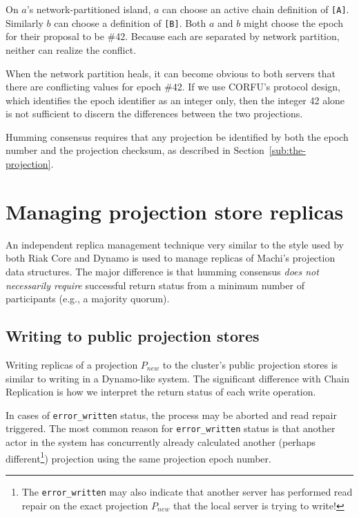 \documentclass[preprint,10pt]{sigplanconf}
\begin{document}
On $a$'s network-partitioned island, $a$ can choose
an active chain definition of {\tt [A]}.
Similarly $b$ can choose a definition of {\tt [B]}.  Both $a$ and $b$
might choose the
epoch for their proposal to be \#42.  Because each are separated by
network partition, neither can realize the conflict.

When the network partition heals, it can become obvious to both
servers that there are conflicting values for epoch \#42.  If we
use CORFU's protocol design, which identifies the epoch identifier as
an integer only, then the integer 42 alone is not sufficient to
discern the differences between the two projections.

Humming consensus requires that any projection be identified by both
the epoch number and the projection checksum, as described in
Section~\ref{sub:the-projection}.

\section{Managing projection store replicas}
\label{sec:managing-multiple-projection-stores}

An independent replica management technique very similar to the style
used by both Riak Core \cite{riak-core} and Dynamo is used to manage
replicas of Machi's projection data structures.
The major difference is that humming consensus
{\em does not necessarily require}
successful return status from a minimum number of participants (e.g.,
a majority quorum).

\subsection{Writing to public projection stores}
\label{sub:proj-store-writing}

Writing replicas of a projection $P_{new}$ to the cluster's public
projection stores is similar to writing in a Dynamo-like system.
The significant difference with Chain Replication is how we interpret
the return status of each write operation.

In cases of {\tt error\_written} status,
the process may be aborted and read repair
triggered.  The most common reason for {\tt error\_written} status
is that another actor in the system has concurrently
already calculated another
(perhaps different\footnote{The {\tt error\_written} may also
indicate that another server has performed read repair on the exact
projection $P_{new}$ that the local server is trying to write!})
projection using the same projection epoch number.
\end{document}

